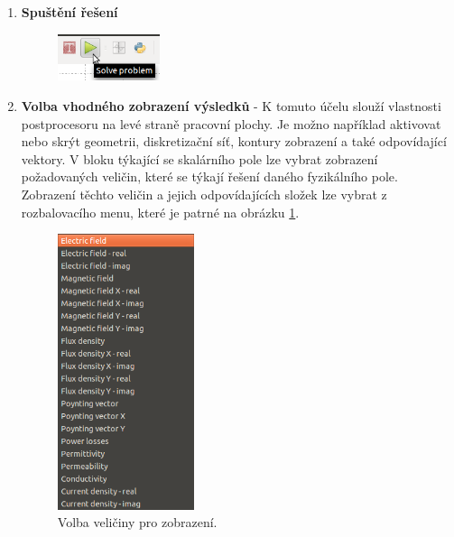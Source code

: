 \begin{enumerate}
\item {\bf Spuštění řešení}
\begin{figure}[!h]
	\centering
	\includegraphics[width=3cm]{sim_spusteni_reseni.png}
\end{figure}
\item {\bf Volba vhodného zobrazení výsledků} - K tomuto účelu slouží vlastnosti postprocesoru na levé straně pracovní plochy. Je možno například aktivovat nebo skrýt geometrii, diskretizační síť, kontury zobrazení a také odpovídající vektory. V bloku týkající se skalárního pole lze vybrat zobrazení požadovaných veličin, které se týkají řešení daného fyzikálního pole. Zobrazení těchto veličin a jejich odpovídajících složek lze vybrat z rozbalovacího menu, které je patrné na obrázku \ref{obr:sim_zobrazeni}.
\begin{figure}[!h]
	\centering
	\includegraphics[width=4cm]{sim_zobrazeni.png}
	\caption{Volba veličiny pro zobrazení.}
	\label{obr:sim_zobrazeni}
\end{figure}
\end{enumerate}



